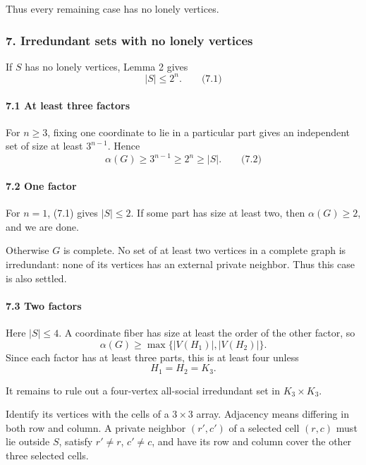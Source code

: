 \documentclass[
  11pt,
  a4paper,
]{article}
\newcounter{none} %
\begin{document}
Thus every remaining case has no lonely vertices.

\subsubsection{7. Irredundant sets with no lonely
vertices}\label{irredundant-sets-with-no-lonely-vertices}

If \(S\) has no lonely vertices, Lemma 2 gives \[
|S|\le2^n.
\qquad\text{(7.1)}
\]

\paragraph{7.1 At least three factors}\label{at-least-three-factors}

For \(n\ge3\), fixing one coordinate to lie in a particular part gives
an independent set of size at least \(3^{n-1}\). Hence \[
\alpha(G)\ge3^{n-1}\ge2^n\ge|S|.
\qquad\text{(7.2)}
\]

\paragraph{7.2 One factor}\label{one-factor}

For \(n=1\), (7.1) gives \(|S|\le2\). If some part has size at least
two, then \(\alpha(G)\ge2\), and we are done.

Otherwise \(G\) is complete. No set of at least two vertices in a
complete graph is irredundant: none of its vertices has an external
private neighbor. Thus this case is also settled.

\paragraph{7.3 Two factors}\label{two-factors}

Here \(|S|\le4\). A coordinate fiber has size at least the order of the
other factor, so \[
\alpha(G)\ge\max\{|V(H_1)|,|V(H_2)|\}.
\] Since each factor has at least three parts, this is at least four
unless \[
H_1=H_2=K_3.
\]

It remains to rule out a four-vertex all-social irredundant set in
\(K_3\times K_3\).

Identify its vertices with the cells of a \(3\times3\) array. Adjacency
means differing in both row and column. A private neighbor \((r',c')\)
of a selected cell \((r,c)\) must lie outside \(S\), satisfy
\(r'\ne r\), \(c'\ne c\), and have its row and column cover the other
three selected cells.
\end{document}
